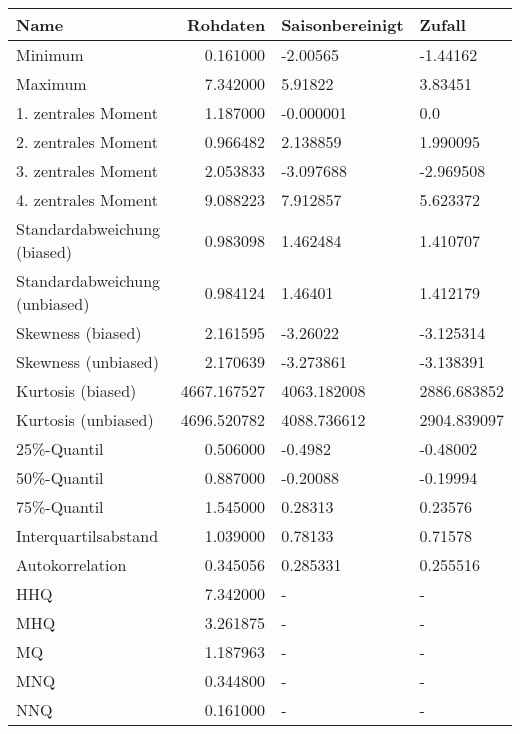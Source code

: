 \begin{tabular}{lrll}
\toprule
                         Name &    Rohdaten & Saisonbereinigt &       Zufall \\
\midrule
                      Minimum &    0.161000 &        -2.00565 &     -1.44162 \\
                      Maximum &    7.342000 &         5.91822 &      3.83451 \\
          1. zentrales Moment &    1.187000 &       -0.000001 &          0.0 \\
          2. zentrales Moment &    0.966482 &        2.138859 &     1.990095 \\
          3. zentrales Moment &    2.053833 &       -3.097688 &    -2.969508 \\
          4. zentrales Moment &    9.088223 &        7.912857 &     5.623372 \\
  Standardabweichung (biased) &    0.983098 &        1.462484 &     1.410707 \\
Standardabweichung (unbiased) &    0.984124 &         1.46401 &     1.412179 \\
            Skewness (biased) &    2.161595 &        -3.26022 &    -3.125314 \\
          Skewness (unbiased) &    2.170639 &       -3.273861 &    -3.138391 \\
            Kurtosis (biased) & 4667.167527 &     4063.182008 &  2886.683852 \\
          Kurtosis (unbiased) & 4696.520782 &     4088.736612 &  2904.839097 \\
                  25\%-Quantil &    0.506000 &         -0.4982 &     -0.48002 \\
                  50\%-Quantil &    0.887000 &        -0.20088 &     -0.19994 \\
                  75\%-Quantil &    1.545000 &         0.28313 &      0.23576 \\
         Interquartilsabstand &    1.039000 &         0.78133 &      0.71578 \\
              Autokorrelation &    0.345056 &        0.285331 &     0.255516 \\
                          HHQ &    7.342000 &               - &            - \\
                          MHQ &    3.261875 &               - &            - \\
                           MQ &    1.187963 &               - &            - \\
                          MNQ &    0.344800 &               - &            - \\
                          NNQ &    0.161000 &               - &            - \\
\bottomrule
\end{tabular}

